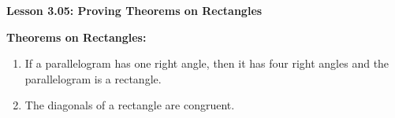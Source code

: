 \begin{center}
\textbf{Lesson 3.05: Proving Theorems on Rectangles}
\end{center}

\vspace*{-1.5ex}

\noindent \textbf{Theorems on Rectangles:}
\begin{enumerate}[noitemsep, label = \color{blue}\arabic*. ]
\item If a parallelogram has one right angle, then it has four right
angles and the parallelogram is a rectangle.
\item The diagonals of a rectangle are congruent.
\end{enumerate}
